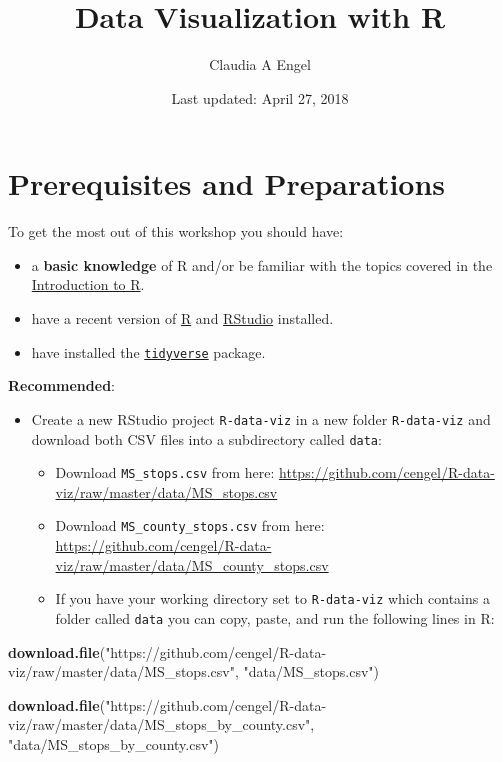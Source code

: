 \documentclass[]{book}
\title{Data Visualization with R}
\author{Claudia A Engel}
\date{Last updated: April 27, 2018}
\newenvironment{Shaded}{\begin{snugshade}}{\end{snugshade}}
\newcommand{\KeywordTok}[1]{\textcolor[rgb]{0.13,0.29,0.53}{\textbf{#1}}}
\newcommand{\StringTok}[1]{\textcolor[rgb]{0.31,0.60,0.02}{#1}}
\newcommand{\NormalTok}[1]{#1}
\providecommand{\tightlist}{%
  \setlength{\itemsep}{0pt}\setlength{\parskip}{0pt}}
\theoremstyle{definition}
\theoremstyle{definition}
\theoremstyle{definition}
\theoremstyle{remark}
\begin{document}
\maketitle

{
\setcounter{tocdepth}{1}
\tableofcontents
}
\chapter*{Prerequisites and
Preparations}\label{prerequisites-and-preparations}

To get the most out of this workshop you should have:

\begin{itemize}
\tightlist
\item
  a \textbf{basic knowledge} of R and/or be familiar with the topics
  covered in the \href{https://cengel.github.io/R-intro/}{Introduction
  to R}.
\item
  have a recent version of \href{https://cran.r-project.org/}{R} and
  \href{https://www.rstudio.com/}{RStudio} installed.
\item
  have installed the \href{http://tidyverse.org/}{\texttt{tidyverse}}
  package.
\end{itemize}

\textbf{Recommended}:

\begin{itemize}
\tightlist
\item
  Create a new RStudio project \texttt{R-data-viz} in a new folder
  \texttt{R-data-viz} and download both CSV files into a subdirectory
  called \texttt{data}:

  \begin{itemize}
  \tightlist
  \item
    Download \texttt{MS\_stops.csv} from here:
    \url{https://github.com/cengel/R-data-viz/raw/master/data/MS_stops.csv}
  \item
    Download \texttt{MS\_county\_stops.csv} from here:
    \url{https://github.com/cengel/R-data-viz/raw/master/data/MS_county_stops.csv}
  \item
    If you have your working directory set to \texttt{R-data-viz} which
    contains a folder called \texttt{data} you can copy, paste, and run
    the following lines in R:
  \end{itemize}
\end{itemize}

\begin{Shaded}
\begin{Highlighting}[]
\KeywordTok{download.file}\NormalTok{(}\StringTok{"https://github.com/cengel/R-data-viz/raw/master/data/MS_stops.csv"}\NormalTok{, }
              \StringTok{"data/MS_stops.csv"}\NormalTok{)}

\KeywordTok{download.file}\NormalTok{(}\StringTok{"https://github.com/cengel/R-data-viz/raw/master/data/MS_stops_by_county.csv"}\NormalTok{, }
              \StringTok{"data/MS_stops_by_county.csv"}\NormalTok{)}
\end{Highlighting}
\end{Shaded}
\end{document}
